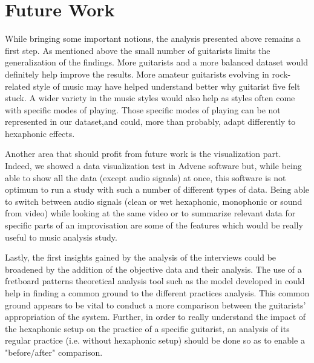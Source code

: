 \documentclass{article}
\begin{document}
\section{Future Work}\label{sec:future_work}

While bringing some important notions, the analysis presented above remains a first step.  As mentioned above the small number of guitarists limits the generalization of the findings. More guitarists and a more balanced dataset would definitely help improve the results.  More amateur guitarists evolving in rock-related style of music may have helped understand better why guitarist five felt stuck.
A wider variety in the music styles would also help as styles often come with specific modes of playing. Those specific modes of playing can be not represented in our dataset,and could, more than probably, adapt differently to hexaphonic effects.

Another area that should profit from future work is the visualization part. Indeed, we showed a data visualization test in Advene software but, while being able to show all the data (except audio signals) at once, this software is not optimum to run a study with such a number of different types of data.  Being able to switch between audio signals (clean or wet hexaphonic, monophonic or sound from video) while looking at the same video or to summarize relevant data for specific parts of an improvisation are some of the features which would be really useful to music analysis study.

Lastly, the first insights gained by the analysis of the interviews could be broadened by the addition of the objective data and their analysis. The use of a fretboard patterns theoretical analysis tool such as the model developed in \cite{musico:deSouza2018_fretboard} could help in finding a common ground to the different practices analysis.  This common ground appears to be vital to conduct a more comparison between the guitarists' appropriation of the system.
Further, in order to really understand the impact of the hexaphonic setup on the practice of a specific guitarist, an analysis of its regular practice (i.e. without hexaphonic setup) should be done so as to enable a "before/after" comparison.
\end{document}
